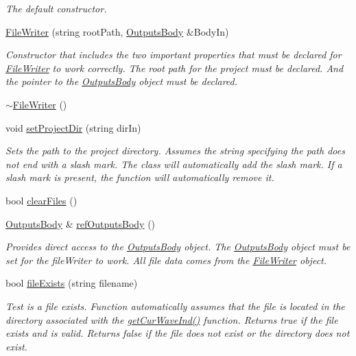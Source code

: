 \begin{DoxyCompactItemize}
\begin{DoxyCompactList}\small\item\em The default constructor. \end{DoxyCompactList}\item 
\hyperlink{class_file_writer_a08b98dceafbf0cd0875197072dfd7d58}{File\-Writer} (string root\-Path, \hyperlink{class_outputs_body}{Outputs\-Body} \&Body\-In)
\begin{DoxyCompactList}\small\item\em Constructor that includes the two important properties that must be declared for \hyperlink{class_file_writer}{File\-Writer} to work correctly. The root path for the project must be declared. And the pointer to the \hyperlink{class_outputs_body}{Outputs\-Body} object must be declared. \end{DoxyCompactList}\item 
\hyperlink{class_file_writer_ae5490307dcaf9237f4c1b8b8df433e03}{$\sim$\-File\-Writer} ()
\item 
void \hyperlink{class_file_writer_a15370335402192f7e5342a6049f664fc}{set\-Project\-Dir} (string dir\-In)
\begin{DoxyCompactList}\small\item\em Sets the path to the project directory. Assumes the string specifying the path does not end with a slash mark. The class will automatically add the slash mark. If a slash mark is present, the function will automatically remove it. \end{DoxyCompactList}\item 
bool \hyperlink{class_file_writer_a74a40c3c47b4d12582a2aa44c38d9d07}{clear\-Files} ()
\item 
\hyperlink{class_outputs_body}{Outputs\-Body} \& \hyperlink{class_file_writer_a77da1b41e1332209f39243fcca4d1287}{ref\-Outputs\-Body} ()
\begin{DoxyCompactList}\small\item\em Provides direct access to the \hyperlink{class_outputs_body}{Outputs\-Body} object. The \hyperlink{class_outputs_body}{Outputs\-Body} object must be set for the file\-Writer to work. All file data comes from the \hyperlink{class_file_writer}{File\-Writer} object. \end{DoxyCompactList}\item 
bool \hyperlink{class_file_writer_a268a7349181f2d8c739a0809ba0eede2}{file\-Exists} (string filename)
\begin{DoxyCompactList}\small\item\em Test is a file exists. Function automatically assumes that the file is located in the directory associated with the \hyperlink{class_file_writer_a9748d987475a225b49e14f48b8be0cd6}{get\-Cur\-Wave\-Ind()} function. Returns true if the file exists and is valid. Returns false if the file does not exist or the directory does not exist. \end{DoxyCompactList}\item 

\end{DoxyCompactItemize}
